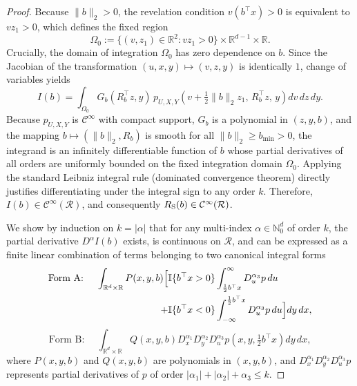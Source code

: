 \begin{proof}
Because $\|b\|_2 > 0$, the revelation condition $v(b^\top x) > 0$ is equivalent to $v z_1 > 0$, which defines the fixed region
\begin{equation*}
    \Omega_0 := \{(v, z_1) \in \mathbb{R}^2 : v z_1 > 0\} \times \mathbb{R}^{d-1} \times \mathbb{R}.
\end{equation*}
Crucially, the domain of integration $\Omega_0$ has zero dependence on $b$. Since the Jacobian of the transformation $(u, x, y) \mapsto (v, z, y)$ is identically $1$, change of variables yields
\begin{equation*}
    I(b) = \int_{\Omega_0} G_b(R_b^\top z, y) \, p_{U,X,Y}\left(v + \tfrac{1}{2}\|b\|_2 z_1,\, R_b^\top z,\, y\right) dv \, dz \, dy.
\end{equation*}
Because $p_{U,X,Y}$ is $\mathcal{C}^\infty$ with compact support, $G_b$ is a polynomial in $(z, y, b)$, and the mapping $b \mapsto (\|b\|_2, R_b)$ is smooth for all $\|b\|_2 \ge b_{\min} > 0$, the integrand is an infinitely differentiable function of $b$ whose partial derivatives of all orders are uniformly bounded on the fixed integration domain $\Omega_0$. Applying the standard Leibniz integral rule (dominated convergence theorem) directly justifies differentiating under the integral sign to any order $k$. Therefore, $I(b) \in \mathcal{C}^\infty(\mathcal{R})$, and consequently $R_{\mathrm{S}}(b) \in \mathcal{C}^\infty(\mathcal{R})$.

\iffalse
We show by induction on $k = |\alpha|$ that for any multi-index $\alpha \in \mathbb{N}_0^d$ of order $k$, the partial derivative $D^\alpha I(b)$ exists, is continuous on $\mathcal{R}$, and can be expressed as a finite linear combination of terms belonging to two canonical integral forms
\begin{equation}
\label{eq:form_a}
\begin{aligned}
    \text{Form A: } \quad \int_{\mathbb{R}^d \times \mathbb{R}} P(x,y,b) \Big[ &\mathbb{I}\{b^\top x > 0\}\int_{\frac{1}{2}b^\top x}^{\infty} D_u^{\alpha_3} p \, du \\
    + &\mathbb{I}\{b^\top x < 0\}\int_{-\infty}^{\frac{1}{2}b^\top x} D_u^{\alpha_3} p \, du \Big] dy \, dx,
\end{aligned}
\end{equation}
\begin{equation}
\label{eq:form_b}
    \text{Form B: } \quad \int_{\mathbb{R}^d \times \mathbb{R}} Q(x,y,b) D_x^{\alpha_1} D_y^{\alpha_2} D_u^{\alpha_3} p\left(x, y, \tfrac{1}{2}b^\top x\right) dy \, dx,
\end{equation}
where $P(x,y,b)$ and $Q(x,y,b)$ are polynomials in $(x,y,b)$, and $D_x^{\alpha_1} D_y^{\alpha_2} D_u^{\alpha_3} p$ represents partial derivatives of $p$ of order $|\alpha_1|+|\alpha_2|+\alpha_3 \le k$.


\end{proof}
